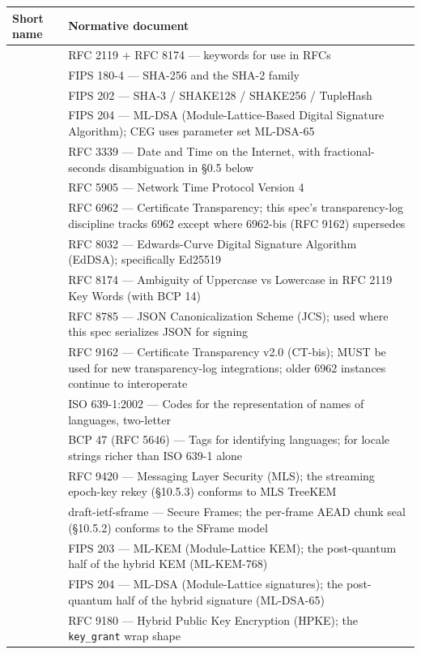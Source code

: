 \documentclass[11pt]{article}
\begin{document}
{\footnotesize
\begin{longtable}{|p{8.0cm}|p{8.0cm}|}\hline
\textbf{Short name} & \textbf{Normative document} \\ \hline\endhead
[BCP 14] & RFC 2119 + RFC 8174 — keywords for use in RFCs \\ \hline
[FIPS-180-4] & FIPS 180-4 — SHA-256 and the SHA-2 family \\ \hline
[FIPS-202] & FIPS 202 — SHA-3 / SHAKE128 / SHAKE256 / TupleHash \\ \hline
[FIPS-204] & FIPS 204 — ML-DSA (Module-Lattice-Based Digital Signature Algorithm); CEG uses parameter set ML-DSA-65 \\ \hline
[RFC-3339] & RFC 3339 — Date and Time on the Internet, with fractional-seconds disambiguation in §0.5 below \\ \hline
[RFC-5905] & RFC 5905 — Network Time Protocol Version 4 \\ \hline
[RFC-6962] & RFC 6962 — Certificate Transparency; this spec's transparency-log discipline tracks 6962 except where 6962-bis (RFC 9162) supersedes \\ \hline
[RFC-8032] & RFC 8032 — Edwards-Curve Digital Signature Algorithm (EdDSA); specifically Ed25519 \\ \hline
[RFC-8174] & RFC 8174 — Ambiguity of Uppercase vs Lowercase in RFC 2119 Key Words (with BCP 14) \\ \hline
[RFC-8785] & RFC 8785 — JSON Canonicalization Scheme (JCS); used where this spec serializes JSON for signing \\ \hline
[RFC-9162] & RFC 9162 — Certificate Transparency v2.0 (CT-bis); MUST be used for new transparency-log integrations; older 6962 instances continue to interoperate \\ \hline
[ISO-639-1] & ISO 639-1:2002 — Codes for the representation of names of languages, two-letter \\ \hline
[BCP-47] & BCP 47 (RFC 5646) — Tags for identifying languages; for locale strings richer than ISO 639-1 alone \\ \hline
[RFC-9420] & RFC 9420 — Messaging Layer Security (MLS); the streaming epoch-key rekey (§10.5.3) conforms to MLS TreeKEM \\ \hline
[SFrame] & draft-ietf-sframe — Secure Frames; the per-frame AEAD chunk seal (§10.5.2) conforms to the SFrame model \\ \hline
[FIPS-203] & FIPS 203 — ML-KEM (Module-Lattice KEM); the post-quantum half of the hybrid KEM (ML-KEM-768) \\ \hline
[FIPS-204] & FIPS 204 — ML-DSA (Module-Lattice signatures); the post-quantum half of the hybrid signature (ML-DSA-65) \\ \hline
[RFC-9180] & RFC 9180 — Hybrid Public Key Encryption (HPKE); the \texttt{key\_grant} wrap shape \\ \hline
\end{longtable}}
\end{document}
